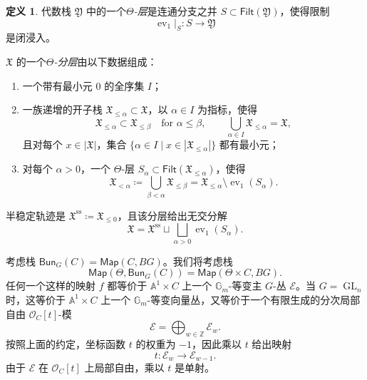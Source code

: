 \documentclass{amsart}
\theoremstyle{definition}
\newtheorem{defn}[thm]{定义}
\theoremstyle{remark}
\theoremstyle{plain}
\theoremstyle{definition}
\theoremstyle{remark}
\newcommand{\A}{\mathbb{A}}
\newcommand{\G}{\mathbb{G}}
\newcommand{\Z}{\mathbb{Z}}
\newcommand{\mc}[1]{\mathcal{#1}}
\newcommand{\mf}[1]{\mathfrak{#1}}
\newcommand{\mr}[1]{\mathrm{#1}}
\newcommand{\on}[1]{\operatorname{#1}}
\newcommand{\ms}[1]{\mathsf{#1}}
\newcommand{\1}{\mathbf{1}}
\newcommand{\2}{\mathbf{2}}
\newcommand{\3}{\mathbf{3}}
\DeclareMathOperator{\ev}{ev}
\begin{document}
\begin{defn}
    代数栈 \(\mf{Y}\) 中的一个\textit{\(\Theta\)-层}是连通分支之并 \(S\subset\ms{Filt}(\mf{Y})\)，使得限制
    \[
        \ev_1|_S\colon S\longrightarrow\mf{Y}
    \]
    是闭浸入。

    \(\mf{X}\) 的一个\textit{\(\Theta\)-分层}由以下数据组成：
    \begin{enumerate}
        \item 一个带有最小元 \(0\) 的全序集 \(I\)；
        \item 一族递增的开子栈 \(\mf{X}_{\leq\alpha}\subset\mf{X}\)，以 \(\alpha\in I\) 为指标，使得
        \[
            \mf{X}_{\leq\alpha}\subset\mf{X}_{\leq\beta}
            \quad\text{for }\alpha\leq\beta,
            \qquad
            \bigcup_{\alpha\in I}\mf{X}_{\leq\alpha}=\mf{X},
        \]
        且对每个 \(x\in|\mf{X}|\)，集合 \(\{\alpha\in I\mid x\in|\mf{X}_{\leq\alpha}|\}\) 都有最小元；
        \item 对每个 \(\alpha>0\)，一个 \(\Theta\)-层 \(S_\alpha\subset\ms{Filt}(\mf{X}_{\leq\alpha})\)，使得
        \[
            \mf{X}_{<\alpha}
            \coloneqq
            \bigcup_{\beta<\alpha}\mf{X}_{\leq\beta}
            =
            \mf{X}_{\leq\alpha}\setminus\ev_1(S_\alpha).
        \]
    \end{enumerate}
    半稳定轨迹是 \(\mf{X}^{\mr{ss}}\coloneqq\mf{X}_{\leq0}\)，且该分层给出无交分解
    \[
        \mf{X}
        =
        \mf{X}^{\mr{ss}}
        \sqcup
        \bigsqcup_{\alpha>0}\ev_1(S_\alpha).
    \]
\end{defn}

考虑栈 \(\ms{Bun}_G(C) = \ms{Map}(C, BG)\)。我们将考虑栈
\[ \ms{Map}(\Theta, \ms{Bun}_G(C)) = \ms{Map}(\Theta \times C, BG). \]
任何一个这样的映射 \(f\) 都等价于 \(\A^1\times C\) 上一个 \(\G_m\)-等变主 \(G\)-丛 \(\mc{E}\)。当 \(G=\on{GL}_n\) 时，这等价于 \(\A^1\times C\) 上一个 \(\G_m\)-等变向量丛，又等价于一个有限生成的分次局部自由 \(\mc{O}_C[t]\)-模
\[
    \mc{E}=\bigoplus_{w\in\Z}\mc{E}_w.
\]
按照上面的约定，坐标函数 \(t\) 的权重为 \(-1\)，因此乘以 \(t\) 给出映射
\[
    t\colon\mc{E}_w\longrightarrow\mc{E}_{w-1}.
\]
由于 \(\mc{E}\) 在 \(\mc{O}_C[t]\) 上局部自由，乘以 \(t\) 是单射。
\end{document}
